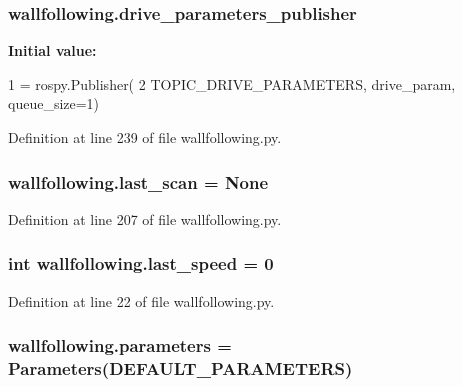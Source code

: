 \subsubsection[{\texorpdfstring{drive\+\_\+parameters\+\_\+publisher}{drive_parameters_publisher}}]{\setlength{\rightskip}{0pt plus 5cm}wallfollowing.\+drive\+\_\+parameters\+\_\+publisher}\hypertarget{namespacewallfollowing_aa69138defbbc5f21e99db50a6b3c903f}{}\label{namespacewallfollowing_aa69138defbbc5f21e99db50a6b3c903f}
{\bfseries Initial value\+:}
\begin{DoxyCode}
1 = rospy.Publisher(
2     TOPIC\_DRIVE\_PARAMETERS, drive\_param, queue\_size=1)
\end{DoxyCode}


Definition at line 239 of file wallfollowing.\+py.

\subsubsection[{\texorpdfstring{last\+\_\+scan}{last_scan}}]{\setlength{\rightskip}{0pt plus 5cm}wallfollowing.\+last\+\_\+scan = None}\hypertarget{namespacewallfollowing_ab6c7c8e53e8b1cd44872666515dd5764}{}\label{namespacewallfollowing_ab6c7c8e53e8b1cd44872666515dd5764}


Definition at line 207 of file wallfollowing.\+py.

\subsubsection[{\texorpdfstring{last\+\_\+speed}{last_speed}}]{\setlength{\rightskip}{0pt plus 5cm}int wallfollowing.\+last\+\_\+speed = 0}\hypertarget{namespacewallfollowing_a9ee8d77a4629b5d8ecb2899da6e3a7fe}{}\label{namespacewallfollowing_a9ee8d77a4629b5d8ecb2899da6e3a7fe}


Definition at line 22 of file wallfollowing.\+py.

\subsubsection[{\texorpdfstring{parameters}{parameters}}]{\setlength{\rightskip}{0pt plus 5cm}wallfollowing.\+parameters = {\bf Parameters}({\bf D\+E\+F\+A\+U\+L\+T\+\_\+\+P\+A\+R\+A\+M\+E\+T\+E\+RS})}\hypertarget{namespacewallfollowing_ae96254db0e391eed9862d0a6f636033e}{}\label{namespacewallfollowing_ae96254db0e391eed9862d0a6f636033e}


